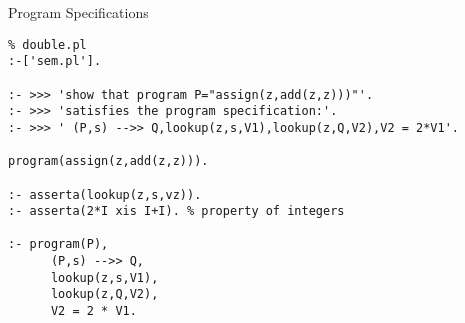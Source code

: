 \documentclass{beamer}
\begin{document}
\begin{frame}[fragile]{Program Specifications}

{\scriptsize
\begin{verbatim}
% double.pl
:-['sem.pl'].

:- >>> 'show that program P="assign(z,add(z,z)))"'.
:- >>> 'satisfies the program specification:'.
:- >>> ' (P,s) -->> Q,lookup(z,s,V1),lookup(z,Q,V2),V2 = 2*V1'.

program(assign(z,add(z,z))).

:- asserta(lookup(z,s,vz)).                                                                        
:- asserta(2*I xis I+I). % property of integers                                               
                                                                                                   
:- program(P),
      (P,s) -->> Q,
      lookup(z,s,V1),                                                                              
      lookup(z,Q,V2),
      V2 = 2 * V1.
\end{verbatim}
}
\end{frame}
\end{document}
